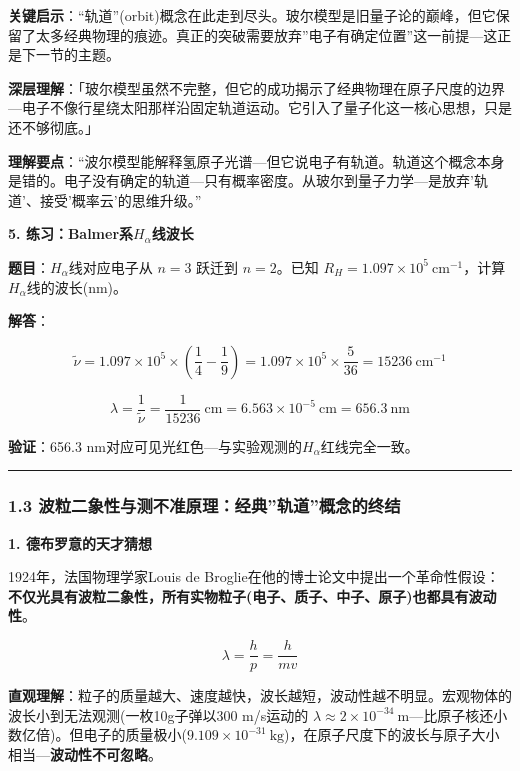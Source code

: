 \textbf{关键启示}：``轨道''(orbit)概念在此走到尽头。玻尔模型是旧量子论的巅峰，但它保留了太多经典物理的痕迹。真正的突破需要放弃''电子有确定位置''这一前提---这正是下一节的主题。

\textbf{深层理解}：「玻尔模型虽然不完整，但它的成功揭示了经典物理在原子尺度的边界---电子不像行星绕太阳那样沿固定轨道运动。它引入了量子化这一核心思想，只是还不够彻底。」

\textbf{理解要点}：``波尔模型能解释氢原子光谱---但它说电子有轨道。轨道这个概念本身是错的。电子没有确定的轨道---只有概率密度。从玻尔到量子力学---是放弃'轨道'、接受'概率云'的思维升级。''

\textbf{5. 练习：Balmer系\(H_\alpha\)线波长}

\textbf{题目}：\(H_\alpha\)线对应电子从 \(n=3\) 跃迁到 \(n=2\)。已知 \(R_H = 1.097 \times 10^5\ \mathrm{cm^{-1}}\)，计算\(H_\alpha\)线的波长(nm)。

\textbf{解答}：

\[
\tilde{\nu} = 1.097\times 10^5 \times \left(\frac{1}{4} - \frac{1}{9}\right) = 1.097\times 10^5 \times \frac{5}{36} = 15236\ \mathrm{cm^{-1}}
\]

\[
\lambda = \frac{1}{\tilde{\nu}} = \frac{1}{15236}\ \mathrm{cm} = 6.563\times 10^{-5}\ \mathrm{cm} = 656.3\ \mathrm{nm}
\]

\textbf{验证}：656.3 nm对应可见光红色---与实验观测的\(H_\alpha\)红线完全一致。

\begin{center}\rule{0.5\linewidth}{0.5pt}\end{center}

\subsubsection{1.3 波粒二象性与测不准原理：经典''轨道''概念的终结}\label{ux6ce2ux7c92ux4e8cux8c61ux6027ux4e0eux6d4bux4e0dux51c6ux539fux7406ux7ecfux5178ux8f68ux9053ux6982ux5ff5ux7684ux7ec8ux7ed3}

\textbf{1. 德布罗意的天才猜想}

1924年，法国物理学家Louis de Broglie在他的博士论文中提出一个革命性假设：\textbf{不仅光具有波粒二象性，所有实物粒子(电子、质子、中子、原子)也都具有波动性}。

\[\lambda = \frac{h}{p} = \frac{h}{mv}\]

\textbf{直观理解}：粒子的质量越大、速度越快，波长越短，波动性越不明显。宏观物体的波长小到无法观测(一枚10g子弹以300 m/s运动的 \(\lambda \approx 2\times 10^{-34}\ \mathrm{m}\)---比原子核还小数亿倍)。但电子的质量极小(\(9.109\times 10^{-31}\ \mathrm{kg}\))，在原子尺度下的波长与原子大小相当---\textbf{波动性不可忽略}。

